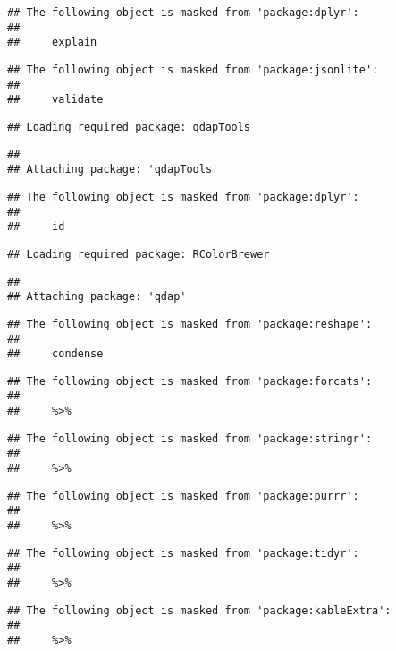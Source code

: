 \documentclass[]{article}
\begin{document}
\begin{verbatim}
## The following object is masked from 'package:dplyr':
## 
##     explain
\end{verbatim}

\begin{verbatim}
## The following object is masked from 'package:jsonlite':
## 
##     validate
\end{verbatim}

\begin{verbatim}
## Loading required package: qdapTools
\end{verbatim}

\begin{verbatim}
## 
## Attaching package: 'qdapTools'
\end{verbatim}

\begin{verbatim}
## The following object is masked from 'package:dplyr':
## 
##     id
\end{verbatim}

\begin{verbatim}
## Loading required package: RColorBrewer
\end{verbatim}

\begin{verbatim}
## 
## Attaching package: 'qdap'
\end{verbatim}

\begin{verbatim}
## The following object is masked from 'package:reshape':
## 
##     condense
\end{verbatim}

\begin{verbatim}
## The following object is masked from 'package:forcats':
## 
##     %>%
\end{verbatim}

\begin{verbatim}
## The following object is masked from 'package:stringr':
## 
##     %>%
\end{verbatim}

\begin{verbatim}
## The following object is masked from 'package:purrr':
## 
##     %>%
\end{verbatim}

\begin{verbatim}
## The following object is masked from 'package:tidyr':
## 
##     %>%
\end{verbatim}

\begin{verbatim}
## The following object is masked from 'package:kableExtra':
## 
##     %>%
\end{verbatim}
\end{document}
